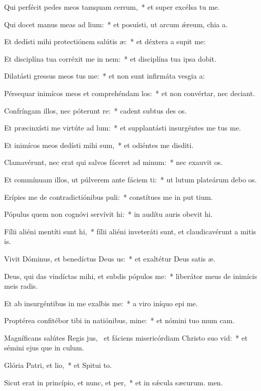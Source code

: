 \item Qui perfécit pedes meos tamquam cerrum,~* et super excélsa tu me.
\item Qui docet manus meas ad lium:~* et posuísti, ut arcum ǽreum, chia a.
\item Et dedísti mihi protectiónem salútis æ:~* et déxtera a supit me:
\item Et disciplína tua corréxit me in nem:~* et disciplína tua ipsa  dobit.
\item Dilatásti gressus meos tus me:~* et non sunt infirmáta vesgia a:
\item Pérsequar inimícos meos et comprehéndam los:~* et non convértar, nec deciant.
\item Confríngam illos, nec póterunt re:~* cadent subtus des os.
\item Et præcinxísti me virtúte ad lum:~* et supplantásti insurgéntes  me tus me.
\item Et inimícos meos dedísti mihi sum,~* et odiéntes me disditi.
\item Clamavérunt, nec erat qui salvos fáceret ad minum:~* nec exauvit os.
\item Et commínuam illos, ut púlverem ante fáciem ti:~* ut lutum plateárum debo os.
\item Erípies me de contradictiónibus puli:~* constítues me in put tium.
\item Pópulus quem non cognóvi servívit hi:~* in audítu auris obevit hi.
\item Fílii aliéni mentíti sunt hi,~* fílii aliéni inveteráti sunt, et claudicavérunt a mitis is.
\item Vivit Dóminus, et benedíctus Deus us:~* et exaltétur Deus satis æ.
\item Deus, qui das vindíctas mihi, et subdis pópulos  me:~* liberátor meus de inimícis meis radis.
\item Et ab insurgéntibus in me exalbis me:~* a viro iníquo epi me.
\item Proptérea confitébor tibi in natiónibus, mine:~* et nómini tuo mum cam.
\item Magníficans salútes Regis jus,~\pscross{} et fáciens misericórdiam Christo suo vid:~* et sémini ejus que in culum.
\item Glória Patri, et lio,~* et Spitui to.
\item Sicut erat in princípio, et nunc, et per,~* et in sǽcula sæcurum. men.
